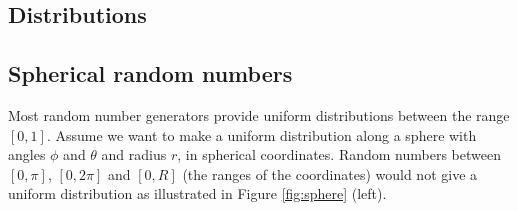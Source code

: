 \begin{appendices}

\chapter{Distributions}
\label{ch:distributions}

\section{Spherical random numbers}
\label{sec:sphericalrandom}
Most random number generators provide uniform distributions between the range $[0,1]$. Assume we want to make a uniform distribution along a sphere with angles $\phi$ and $\theta$ and radius $r$, in spherical coordinates. Random numbers between $[0,\pi]$, $[0,2\pi]$ and $[0,R]$ (the ranges of the coordinates) would not give a uniform distribution as illustrated in Figure \ref{fig:sphere} (left).\\


\end{appendices}
